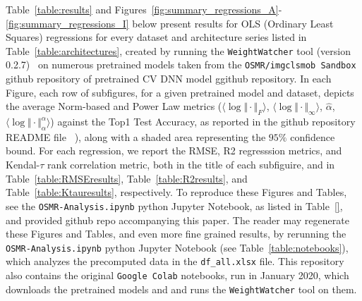 Table~\ref{table:results} and Figures~\ref{fig:summary_regressions_A}-\ref{fig:summary_regressions_I} below present results for OLS 
(Ordinary Least Squares) regressions for every dataset and architecture series listed in Table~\ref{table:architectures},
 created by running the \texttt{WeightWatcher} tool (version 0.2.7)~\cite{weightwatcher_package}
on numerous pretrained models taken from the \texttt{OSMR/imgclsmob Sandbox} github repository of pretrained CV DNN model
ggithub repository. 
In each Figure,  each row of subfigures, for a given pretrained model and dataset, depicts the average Norm-based and Power Law metrics
 ($\langle\log\Vert\cdot\Vert_{F}\rangle$,    $\langle\log\Vert\cdot\Vert_{\infty}\rangle$,
$\hat{\alpha}$,  $\langle\log\Vert\cdot\Vert^{\alpha}_{\alpha}\rangle$)
 against the Top1 Test Accuracy, as reported in the github repository README file~\cite{osmr} ),
along with a shaded area representing the $95\%$ confidence bound.
For each regression, we report the RMSE, R2 regresssion metrics, and Kendal-$\tau$ rank correlation metric,
both in the title of each subfiguire, and in Table~\ref{table:RMSEresults}, Table~\ref{table:R2results}, and Table~\ref{table:Ktauresults}, respectively.
To reproduce these Figures and Tables, see the \texttt{OSMR-Analysis.ipynb} python Jupyter Notebook, as listed in Table~\ref{},
and provided github repo accompanying this paper.
The reader may regenerate these Figures and Tables,
and even more fine grained results, by rerunning
 the \texttt{OSMR-Analysis.ipynb} python Jupyter Notebook (see Table~\ref{table:notebooks}), which 
analyzes the precomputed data in the \texttt{df\_all.xlsx} file. 
This repository also contains the original \texttt{Google Colab} notebooks, run in January 2020, 
which downloads the pretrained models and  and runs the \texttt{WeightWatcher} tool on them.
